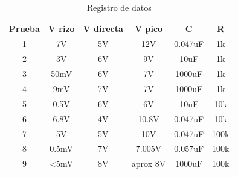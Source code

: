 \documentclass{article}
\begin{document}
\begin{table}[ht!]
\centering
\begin{tabular}{|c|c|c|c|c|c|}
\hline
Prueba & V rizo       & V directa & V pico   & C       & R    \\ \hline
1      & 7V           & 5V        & 12V      & 0.047uF & 1k   \\ \hline
2      & 3V           & 6V        & 9V       & 10uF    & 1k   \\ \hline
3      & 50mV         & 6V        & 7V       & 1000uF  & 1k   \\ \hline
4      & 9mV          & 7V        & 7V       & 1000uF  & 1k   \\ \hline
5      & 0.5V         & 6V        & 6V       & 10uF    & 10k  \\ \hline
6      & 6.8V         & 4V        & 10.8V    & 0.047uF & 10k  \\ \hline
7      & 5V           & 5V        & 10V      & 0.047uF & 100k \\ \hline
8      & 0.5mV        & 7V        & 7.005V   & 0.057uF & 100k \\ \hline
9      & \textless5mV & 8V        & aprox 8V & 1000uF  & 100k \\ \hline
\end{tabular}


\caption{Registro de datos}
\label{datosRectificadorOC}
\end{table}









\end{document}
